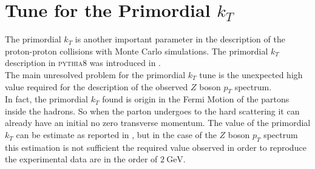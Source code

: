 \chapter{Tune for the Primordial $k_T$}
\label{chap:primordialkTtune}

The primordial $k_T$ is another important parameter in the description of the proton-proton collisions with Monte Carlo simulations. The primordial $k_T$ description in \textsc{pythia8} was introduced in .
\\
The main unresolved problem for the primordial $k_T$ tune is the unexpected high value required for the description of the observed $Z$ boson $p_T$ spectrum.
\\
In fact, the primordial $k_T$ found is origin in the Fermi Motion of the partons inside the hadrons. So when the parton undergoes to the hard scattering it can already have an initial no zero transverse momentum.
The value of the primordial $k_T$ can be estimate as reported in , but in the case of the $Z$ boson $p_T$ spectrum this estimation is not sufficient the required value observed in order to reproduce the experimental data are in the order of $2\ \mathrm{GeV}$.





